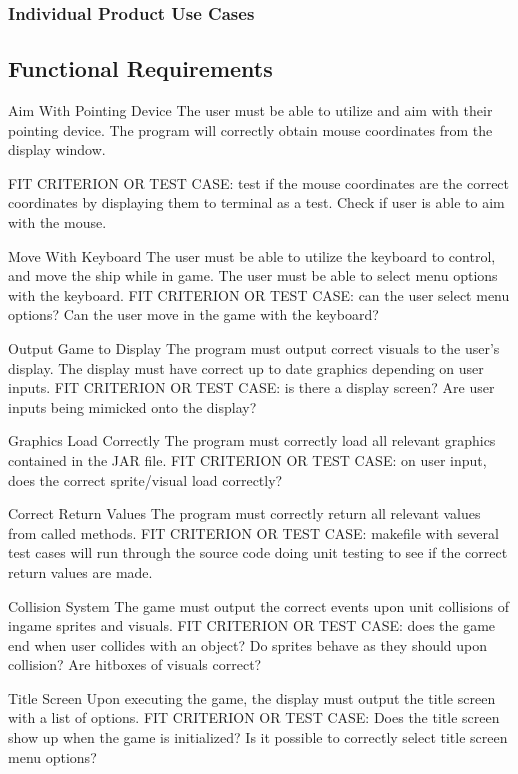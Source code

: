 \documentclass[12pt, titlepage]{article}
\begin{document}
\subsubsection{Individual Product Use Cases}
\subsection{Functional Requirements}
Aim With Pointing Device
The user must be able to utilize and aim with their pointing device. The program will correctly obtain mouse coordinates from the display window.

FIT CRITERION OR TEST CASE: test if the mouse coordinates are the correct coordinates by displaying them to terminal as a test. Check if user is able to aim with the mouse.


Move With Keyboard
The user must be able to utilize the keyboard to control, and move the ship while in game. The user must be able to select menu options with the keyboard.
FIT CRITERION OR TEST CASE: can the user select menu options? Can the user move in the game with the keyboard?


Output Game to Display
The program must output correct visuals to the user’s display. The display must have correct up to date graphics depending on user inputs.
FIT CRITERION OR TEST CASE: is there a display screen? Are user inputs being mimicked onto the display?


Graphics Load Correctly
The program must correctly load all relevant graphics contained in the JAR file.
FIT CRITERION OR TEST CASE: on user input, does the correct sprite/visual load correctly?


Correct Return Values
The program must correctly return all relevant values from called methods.
FIT CRITERION OR TEST CASE: makefile with several test cases will run through the source code doing unit testing to see if the correct return values are made.


Collision System
The game must output the correct events upon unit collisions of ingame sprites and visuals.
FIT CRITERION OR TEST CASE: does the game end when user collides with an object? Do sprites behave as they should upon collision? Are hitboxes of visuals correct?


Title Screen 
Upon executing the game, the display must output the title screen with a list of options.
FIT CRITERION OR TEST CASE: Does the title screen show up when the game is initialized? Is it possible to correctly select title screen menu options?
\end{document}
